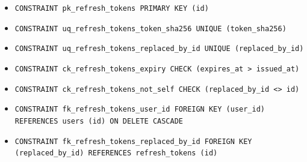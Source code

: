 \begin{itemize}
\item \raggedright {\small\texttt{CONSTRAINT pk\_\allowbreak{}\allowbreak{}refresh\_\allowbreak{}\allowbreak{}tokens PRIMARY KEY (id)}}
\item \raggedright {\small\texttt{CONSTRAINT uq\_\allowbreak{}\allowbreak{}refresh\_\allowbreak{}\allowbreak{}tokens\_\allowbreak{}\allowbreak{}token\_\allowbreak{}\allowbreak{}sha256 UNIQUE (token\_\allowbreak{}\allowbreak{}sha256)}}
\item \raggedright {\small\texttt{CONSTRAINT uq\_\allowbreak{}\allowbreak{}refresh\_\allowbreak{}\allowbreak{}tokens\_\allowbreak{}\allowbreak{}replaced\_\allowbreak{}\allowbreak{}by\_\allowbreak{}\allowbreak{}id UNIQUE (replaced\_\allowbreak{}\allowbreak{}by\_\allowbreak{}\allowbreak{}id)}}
\item \raggedright {\small\texttt{CONSTRAINT ck\_\allowbreak{}\allowbreak{}refresh\_\allowbreak{}\allowbreak{}tokens\_\allowbreak{}\allowbreak{}expiry CHECK (expires\_\allowbreak{}\allowbreak{}at > issued\_\allowbreak{}\allowbreak{}at)}}
\item \raggedright {\small\texttt{CONSTRAINT ck\_\allowbreak{}\allowbreak{}refresh\_\allowbreak{}\allowbreak{}tokens\_\allowbreak{}\allowbreak{}not\_\allowbreak{}\allowbreak{}self CHECK (replaced\_\allowbreak{}\allowbreak{}by\_\allowbreak{}\allowbreak{}id <> id)}}
\item \raggedright {\small\texttt{CONSTRAINT fk\_\allowbreak{}\allowbreak{}refresh\_\allowbreak{}\allowbreak{}tokens\_\allowbreak{}\allowbreak{}user\_\allowbreak{}\allowbreak{}id FOREIGN KEY (user\_\allowbreak{}\allowbreak{}id) REFERENCES users (id) ON DELETE CASCADE}}
\item \raggedright {\small\texttt{CONSTRAINT fk\_\allowbreak{}\allowbreak{}refresh\_\allowbreak{}\allowbreak{}tokens\_\allowbreak{}\allowbreak{}replaced\_\allowbreak{}\allowbreak{}by\_\allowbreak{}\allowbreak{}id FOREIGN KEY (replaced\_\allowbreak{}\allowbreak{}by\_\allowbreak{}\allowbreak{}id) REFERENCES refresh\_\allowbreak{}\allowbreak{}tokens (id)}}
\end{itemize}
